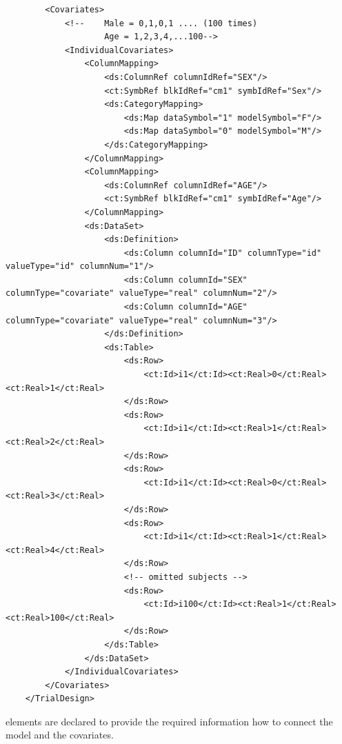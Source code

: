 \begin{lstlisting}
        <Covariates>
            <!--    Male = 0,1,0,1 .... (100 times)
                    Age = 1,2,3,4,...100-->
            <IndividualCovariates>
                <ColumnMapping>
                    <ds:ColumnRef columnIdRef="SEX"/>
                    <ct:SymbRef blkIdRef="cm1" symbIdRef="Sex"/>
                    <ds:CategoryMapping>
                        <ds:Map dataSymbol="1" modelSymbol="F"/>
                        <ds:Map dataSymbol="0" modelSymbol="M"/>
                    </ds:CategoryMapping>
                </ColumnMapping>
                <ColumnMapping>
                    <ds:ColumnRef columnIdRef="AGE"/>
                    <ct:SymbRef blkIdRef="cm1" symbIdRef="Age"/>
                </ColumnMapping>
                <ds:DataSet>
                    <ds:Definition>
                        <ds:Column columnId="ID" columnType="id" valueType="id" columnNum="1"/>
                        <ds:Column columnId="SEX" columnType="covariate" valueType="real" columnNum="2"/>
                        <ds:Column columnId="AGE" columnType="covariate" valueType="real" columnNum="3"/>
                    </ds:Definition>
                    <ds:Table>
                        <ds:Row>
                            <ct:Id>i1</ct:Id><ct:Real>0</ct:Real><ct:Real>1</ct:Real>
                        </ds:Row>
                        <ds:Row>
                            <ct:Id>i1</ct:Id><ct:Real>1</ct:Real><ct:Real>2</ct:Real>
                        </ds:Row>
                        <ds:Row>
                            <ct:Id>i1</ct:Id><ct:Real>0</ct:Real><ct:Real>3</ct:Real>
                        </ds:Row>
                        <ds:Row>
                            <ct:Id>i1</ct:Id><ct:Real>1</ct:Real><ct:Real>4</ct:Real>
                        </ds:Row>
                        <!-- omitted subjects -->
                        <ds:Row>
                            <ct:Id>i100</ct:Id><ct:Real>1</ct:Real><ct:Real>100</ct:Real>
                        </ds:Row>
                    </ds:Table>
                </ds:DataSet>
            </IndividualCovariates>
        </Covariates>
    </TrialDesign>
\end{lstlisting}
 elements are declared to provide the required information 
how to connect the model and the covariates.


